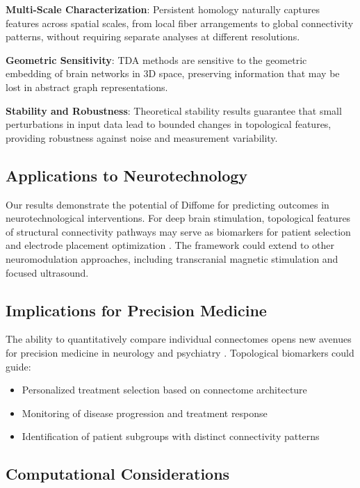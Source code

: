 \documentclass[12pt,a4paper]{article}
\begin{document}
\textbf{Multi-Scale Characterization}: Persistent homology naturally captures features across spatial scales, from local fiber arrangements to global connectivity patterns, without requiring separate analyses at different resolutions.

\textbf{Geometric Sensitivity}: TDA methods are sensitive to the geometric embedding of brain networks in 3D space, preserving information that may be lost in abstract graph representations.

\textbf{Stability and Robustness}: Theoretical stability results guarantee that small perturbations in input data lead to bounded changes in topological features, providing robustness against noise and measurement variability.

\subsection{Applications to Neurotechnology}

Our results demonstrate the potential of Diffome for predicting outcomes in neurotechnological interventions. For deep brain stimulation, topological features of structural connectivity pathways may serve as biomarkers for patient selection and electrode placement optimization \citep{mehta2025comparison}. The framework could extend to other neuromodulation approaches, including transcranial magnetic stimulation and focused ultrasound.

\subsection{Implications for Precision Medicine}

The ability to quantitatively compare individual connectomes opens new avenues for precision medicine in neurology and psychiatry \citep{smith2022therapeutic}. Topological biomarkers could guide:
\begin{itemize}
    \item Personalized treatment selection based on connectome architecture
    \item Monitoring of disease progression and treatment response
    \item Identification of patient subgroups with distinct connectivity patterns
\end{itemize}

\subsection{Computational Considerations}
\end{document}
